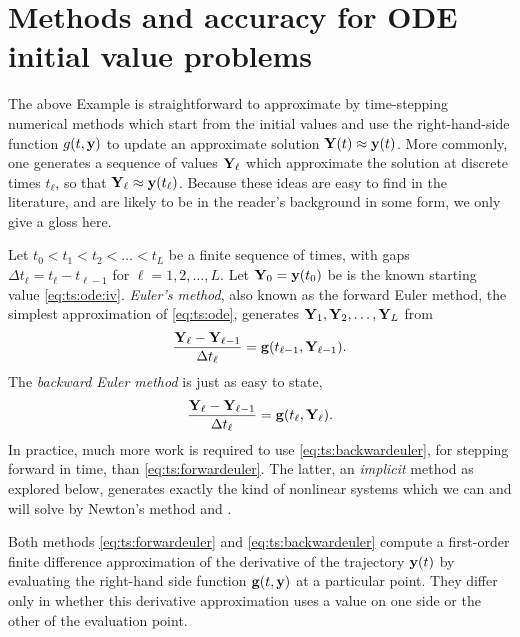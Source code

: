 \section{Methods and accuracy for ODE initial value problems}  The above Example is straightforward to approximate by time-stepping numerical methods which start from the initial values and use the right-hand-side function $g(t,\mathbf{y})$ to update an approximate solution $\mathbf{Y}(t) \approx \mathbf{y}(t)$.  More commonly, one generates a sequence of values $\mathbf{Y}_\ell$ which approximate the solution at discrete times $t_\ell$, so that $\mathbf{Y}_\ell \approx \mathbf{y}(t_\ell)$.  Because these ideas are easy to find in the literature, and are likely to be in the reader's background in some form, we only give a gloss here.

Let $t_0<t_1<t_2<\dots<t_L$ be a finite sequence of times, with gaps $\Delta t_\ell = t_\ell - t_{\ell-1}$ for $\ell=1,2,\dots,L$.  Let $\mathbf{Y}_0 = \mathbf{y}(t_0)$ be is the known starting value  \eqref{eq:ts:ode:iv}.  \emph{Euler's method}, also known as the forward Euler method, the simplest approximation of \eqref{eq:ts:ode}, generates $\mathbf{Y}_1,\mathbf{Y}_2,\dots,\mathbf{Y}_L$ from
\begin{equation}
\frac{\mathbf{Y}_\ell - \mathbf{Y}_{\ell-1}}{\Delta t_\ell} = \mathbf{g}(t_{\ell-1},\mathbf{Y}_{\ell-1}). \label{eq:ts:forwardeuler}
\end{equation}
The \emph{backward Euler method} is just as easy to state,
\begin{equation}
\frac{\mathbf{Y}_\ell - \mathbf{Y}_{\ell-1}}{\Delta t_\ell} = \mathbf{g}(t_{\ell},\mathbf{Y}_{\ell}).  \label{eq:ts:backwardeuler}
\end{equation}
In practice, much more work is required to use \eqref{eq:ts:backwardeuler}, for stepping forward in time, than \eqref{eq:ts:forwardeuler}.  The latter, an \emph{implicit} method as explored below, generates exactly the kind of nonlinear systems which we can and will solve by Newton's method and \pSNES.

Both methods \eqref{eq:ts:forwardeuler} and \eqref{eq:ts:backwardeuler} compute a first-order finite difference approximation of the derivative of the trajectory $\mathbf{y}(t)$ by evaluating the right-hand side function $\mathbf{g}(t,\mathbf{y})$ at a particular point.  They differ only in whether this derivative approximation uses a value on one side or the other of the evaluation point.


